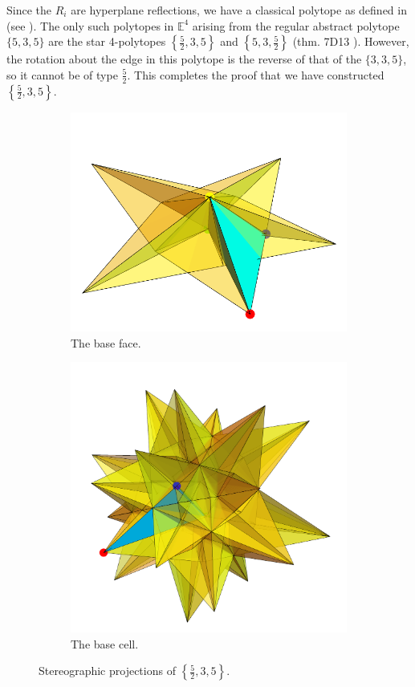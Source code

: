 \documentclass{article}
\theoremstyle{definition}
\begin{document}
	Since the $R_i$ are hyperplane reflections, we have a classical polytope as defined in  (see \cite{mcmullen-4dimensional}). The only such polytopes in $\mathbb{E}^4$ arising from the regular abstract polytope$\{5,3,5\}$ are the star 4-polytopes $\left\{\frac{5}{2},3,5\right\}$ and $\left\{5,3,\frac{5}{2}\right\}$ (thm. 7D13 \cite{abstract-polytopes}). However, the rotation about the edge in this polytope is the reverse of that of the $\{3,3,5\}$, so it cannot be of type $\frac{5}{2}$. This completes the proof that we have constructed $\left\{\frac{5}{2},3,5\right\}$.
	
	\begin{figure}[H]
		\begin{center}
			\begin{subfigure}{\linewidth}
				\centering
				\includegraphics[width=0.5\linewidth]{fig11a}
				\caption{The base face.}\label{fig:11a}
			\end{subfigure}
			\begin{subfigure}{\linewidth}
				\centering
				\includegraphics[width=0.7\linewidth]{fig11b}
				\caption{The base cell.}\label{fig:11b}
			\end{subfigure}
		\end{center}
		\caption{Stereographic projections of  $\left\{\frac{5}{2},3,5\right\}$.}\label{fig:11}
	\end{figure}
\end{document}
